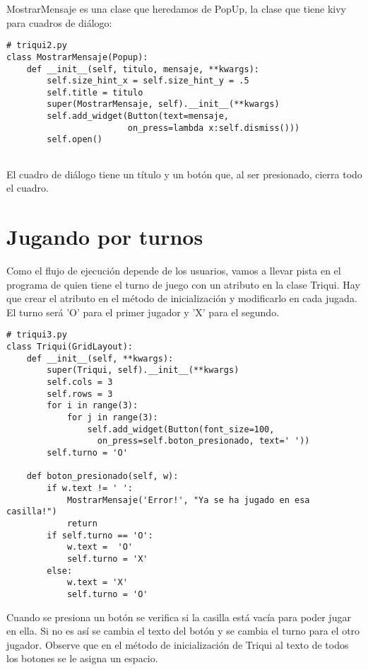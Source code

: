 MostrarMensaje es una clase que heredamos de PopUp, la clase que tiene kivy para
cuadros de diálogo:

\beforeverb
\begin{verbatim}
# triqui2.py
class MostrarMensaje(Popup): 
    def __init__(self, titulo, mensaje, **kwargs):
        self.size_hint_x = self.size_hint_y = .5
        self.title = titulo
        super(MostrarMensaje, self).__init__(**kwargs)
        self.add_widget(Button(text=mensaje, 
                        on_press=lambda x:self.dismiss()))
        self.open()


\end{verbatim}
\afterverb

El cuadro de diálogo tiene un título y un botón que, al ser presionado, cierra
todo el cuadro.

\section{Jugando por turnos}

Como el flujo de ejecución depende de los usuarios, vamos a llevar pista en el 
programa de quien tiene el turno de juego con un atributo en la clase Triqui.
Hay que crear el atributo en el método de inicialización y modificarlo en 
cada jugada. El turno será 'O' para el primer jugador y 'X' para el segundo.

\beforeverb
\begin{verbatim}
# triqui3.py
class Triqui(GridLayout):
    def __init__(self, **kwargs):
        super(Triqui, self).__init__(**kwargs)
        self.cols = 3
        self.rows = 3
        for i in range(3):
            for j in range(3):
                self.add_widget(Button(font_size=100, 
                  on_press=self.boton_presionado, text=' '))
        self.turno = 'O'

    def boton_presionado(self, w):
        if w.text != ' ':
            MostrarMensaje('Error!', "Ya se ha jugado en esa casilla!")
            return
        if self.turno == 'O':
            w.text =  'O'
            self.turno = 'X'
        else:
            w.text = 'X'
            self.turno = 'O'
\end{verbatim}
\afterverb

Cuando se presiona un botón se verifica si la casilla está vacía para poder jugar en 
ella. Si no es así se cambia el texto del botón y se cambia el turno para el otro 
jugador. Observe que en el método de inicialización de Triqui al texto de todos los 
botones se le asigna un espacio.

